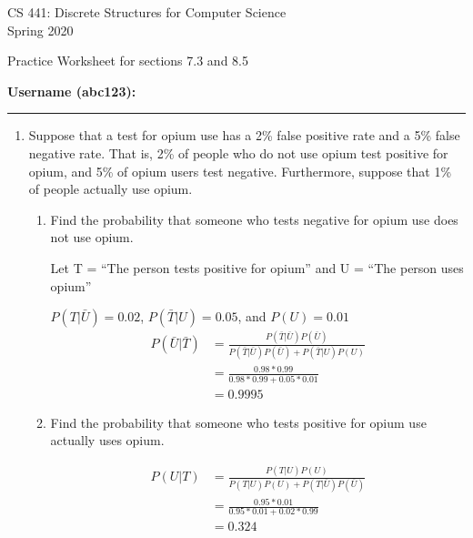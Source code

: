 \documentclass[12pt]{article}
\newenvironment{answer}{\larger[2]}{}
\begin{document}
\begin{center}
CS 441: Discrete Structures for Computer Science \\
{\smaller[1] Spring 2020} \\

\vspace {0.25in}

Practice Worksheet for sections 7.3 and 8.5
\end{center}

\vspace{0.25in}

{\smaller[1]
\textbf{Username (abc123):} \rule{1.25in}{0.4pt}
}

\begin{enumerate} %


\item Suppose that a test for opium use has a 2\% false positive rate and a 5\%
false negative rate. That is, 2\% of people who do not use opium test positive
for opium, and 5\% of opium users test negative. Furthermore, suppose that 1\%
of people actually use opium.
%
\begin{enumerate}[itemsep=\fill,after=\vfill]

\item Find the probability that someone who tests negative for opium use does
not use opium.

\begin{answer}
Let T = ``The person tests positive for opium'' and U = ``The person uses opium''

$P(T|\bar{U}) = 0.02$, $P(\bar{T}|U) = 0.05$, and $P(U) = 0.01$
%
\begin{align*}
P(\bar{U}|\bar{T}) &= \frac{P(\bar{T}|\bar{U})P(\bar{U})}{P(\bar{T}|\bar{U})P(\bar{U}) + P(\bar{T}|U)P(U)} \\
&=\frac{0.98*0.99}{0.98*0.99+0.05*0.01} \\
&= 0.9995
\end{align*}
\end{answer}

\item Find the probability that someone who tests positive for opium use actually uses opium.

\begin{answer}
\begin{align*}
P(U|T) &= \frac{P(T|U)P(U)}{P(T|U)P(U) + P(T|\bar{U})P(\bar{U})} \\
&=\frac{0.95*0.01}{0.95*0.01+0.02*0.99} \\
&= 0.324
\end{align*}
\end{answer}


\end{enumerate}
\end{enumerate}
\end{document}
